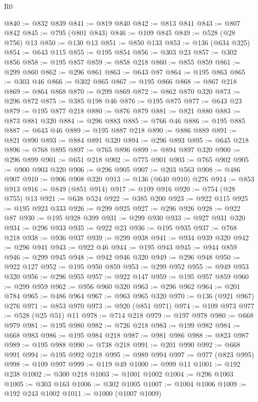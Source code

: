 \begin{lexlean}{R0}
\begin{coremodule}
@840 := @832 @839
@841 := @819 @840
@842 := @813 @841
@843 := @807 @842
@845 := @795 (@801 @843)
@846 := @109 @845
@849 := @528 (@28 @756) @13
@850 := @130 @13
@851 := @850 @133
@853 := @136 (@634 @325)
@854 := @643 @115
@855 := @195 @854
@856 := @303 @23
@857 := @302 @856
@858 := @195 @857
@859 := @858 @218
@860 := @855 @859
@861 := @299 @860
@862 := @296 @861
@863 := @643 @87
@864 := @195 @863
@865 := @303 @46
@866 := @302 @865
@867 := @195 @866
@868 := @867 @218
@869 := @864 @868
@870 := @299 @869
@872 := @862 @870 @320
@873 := @296 @872
@875 := @385 @198 @46
@876 := @195 @875
@877 := @643 @23
@879 := @195 @877 @218
@880 := @876 @879
@881 := @821 @880
@883 := @873 @881 @320
@884 := @296 @883
@885 := @766 @46
@886 := @195 @885
@887 := @643 @46
@889 := @195 @887 @218
@890 := @886 @889
@891 := @821 @890
@893 := @884 @891 @320
@894 := @296 @893
@895 := @645 @218
@896 := @768 @895
@897 := @765 @896
@899 := @894 @897 @320
@900 := @296 @899
@901 := @651 @218
@902 := @775 @901
@903 := @765 @902
@905 := @900 @903 @320
@906 := @296 @905
@907 := @203 @563
@908 := @486 @907
@910 := @906 @908 @320
@913 := @136 (@640 @910) @276
@914 := @853 @913
@916 := @849 (@851 @914)
@917 := @109 @916
@920 := @754 (@28 @755) @13
@921 := @638 @524
@922 := @385 @200
@923 := @922 @115
@925 := @195 @923 @333
@926 := @299 @925
@927 := @296 @926
@928 := @922 @87
@930 := @195 @928 @399
@931 := @299 @930
@933 := @927 @931 @320
@934 := @296 @933
@935 := @922 @23
@936 := @195 @935
@937 := @768 @218
@938 := @936 @937
@939 := @299 @938
@941 := @934 @939 @320
@942 := @296 @941
@943 := @922 @46
@944 := @195 @943
@945 := @944 @859
@946 := @299 @945
@948 := @942 @946 @320
@949 := @296 @948
@950 := @922 @127
@952 := @195 @950 @859
@953 := @299 @952
@955 := @949 @953 @320
@956 := @296 @955
@957 := @922 @147
@959 := @195 @957 @859
@960 := @299 @959
@962 := @956 @960 @320
@963 := @296 @962
@964 := @201 @784
@965 := @486 @964
@967 := @963 @965 @320
@970 := @136 (@921 @967) @276
@971 := @853 @970
@973 := @920 (@851 @971)
@974 := @109 @973
@977 := @528 (@25 @51) @11
@978 := @714 @218
@979 := @197 @978
@980 := @668 @979
@981 := @195 @980
@982 := @726 @218
@983 := @199 @982
@984 := @668 @983
@986 := @195 @984 @218
@987 := @981 @986
@988 := @823 @987
@989 := @195 @988
@990 := @738 @218
@991 := @201 @990
@992 := @668 @991
@994 := @195 @992 @218
@995 := @989 @994
@997 := @977 (@823 @995)
@998 := @109 @997
@999 := @119 @49
@1000 := @999 @11
@1001 := @192 @238
@1002 := @300 @218
@1003 := @1001 @1002
@1004 := @296 @1003
@1005 := @303 @163
@1006 := @302 @1005
@1007 := @1004 @1006
@1009 := @192 @243 @1002
@1011 := @1000 (@1007 @1009)

\end{coremodule}
\end{lexlean}
